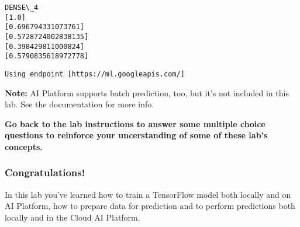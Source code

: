 \documentclass[11pt]{article}
\begin{document}
    \begin{Verbatim}[commandchars=\\\{\}]
DENSE\_4
[1.0]
[0.696794331073761]
[0.5728724002838135]
[0.398429811000824]
[0.5790835618972778]
    \end{Verbatim}

    \begin{Verbatim}[commandchars=\\\{\}]
Using endpoint [https://ml.googleapis.com/]
    \end{Verbatim}

    \textbf{Note:} AI Platform supports batch prediction, too, but it's not
included in this lab. See the documentation for more info.

    \textbf{Go back to the lab instructions to answer some multiple choice
questions to reinforce your uncerstanding of some of these lab's
concepts.}

    \hypertarget{congratulations}{%
\subsubsection{Congratulations!}\label{congratulations}}

In this lab you've learned how to train a TensorFlow model both locally
and on AI Platform, how to prepare data for prediction and to perform
predictions both locally and in the Cloud AI Platform.


    
    
    
\end{document}
